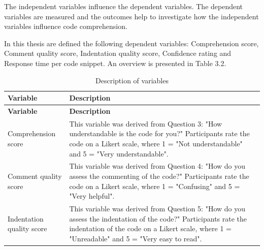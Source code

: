 The independent variables influence the dependent variables. The dependent variables are measured and the outcomes help to investigate how the independent variables influence code comprehension.


In this thesis are defined the following dependent variables: Comprehension score, Comment quality score, Indentation quality score, Confidence rating and  Response time per code snippet. An overview is presented in Table 3.2.


\begin{longtable}{|p{5.5cm}|p{8.5cm}|}
\caption{Description of variables} \label{tab:variables} \\

\hline
\textbf{Variable} & \textbf{Description} \\
\hline
\endfirsthead

\hline
\textbf{Variable} & \textbf{Description} \\
\hline
\endhead

\hline
\parbox[t]{5.5cm}{\vspace{0.3em}Comprehension score\vspace{0.5em}} &
\parbox[t]{8.5cm}{\vspace{0.3em}This variable was derived from Question 3: "How understandable is the code for you?" Participants rate the code on a Likert scale, where 1 = "Not understandable" and 5 = "Very understandable".\vspace{0.5em}} \\
\hline

\parbox[t]{5.5cm}{\vspace{0.3em}Comment quality score\vspace{0.5em}} &
\parbox[t]{8.5cm}{\vspace{0.3em}This variable was derived from Question 4: "How do you assess the commenting of the code?" Participants rate the code on a Likert scale, where 1 = "Confusing" and 5 = "Very helpful".\vspace{0.5em}} \\
\hline

\parbox[t]{5.5cm}{\vspace{0.3em}Indentation quality score\vspace{0.5em}} &
\parbox[t]{8.5cm}{\vspace{0.3em}This variable was derived from Question 5: "How do you assess the indentation of the code?" Participants rate the indentation of the code on a Likert scale, where 1 = "Unreadable" and 5 = "Very easy to read".\vspace{0.5em}} \\
\hline


\end{longtable}
